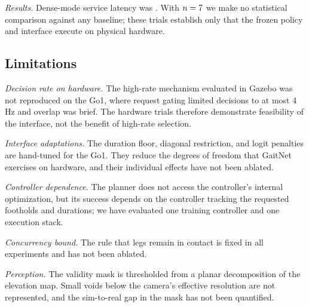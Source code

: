 \textit{Results.}   Dense-mode service latency was
.
 With $n=7$
we make no statistical comparison against any baseline; these trials
establish only that the frozen policy and interface execute on
physical hardware.

\subsection{Limitations}
\label{subsec:exp-limitations}

\textit{Decision rate on hardware.} The high-rate mechanism evaluated
in Gazebo was not reproduced on the Go1, where request gating limited
decisions to at most 4\,Hz and overlap was brief. The hardware trials
therefore demonstrate feasibility of the interface, not the benefit of
high-rate selection.

\textit{Interface adaptations.} The duration floor, diagonal
restriction, and logit penalties are hand-tuned for the Go1. They
reduce the degrees of freedom that GaitNet exercises on hardware, and
their individual effects have not been ablated.

\textit{Controller dependence.} The planner does not access the
controller's internal optimization, but its success depends on the
controller tracking the requested footholds and durations; we have
evaluated one training controller and one execution stack.

\textit{Concurrency bound.} The rule that
\numberstringnum{\corlMinContactLegs} legs remain in contact is fixed
in all experiments and has not been ablated.

\textit{Perception.} The validity mask is thresholded from a planar
decomposition of the elevation map. Small voids below the camera's
effective resolution are not represented, and the sim-to-real gap in
the mask has not been quantified.
